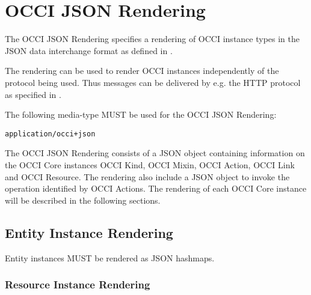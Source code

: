 \documentclass[10pt,a4paper]{article}
\begin{document}
\section{OCCI JSON Rendering}
\label{sec:json_format}
The OCCI JSON Rendering specifies a rendering of OCCI instance types in the JSON
data interchange format as defined in \cite{rfc4627}.

The rendering can be used to render OCCI instances independently of the
protocol being used. Thus messages can be delivered by e.g. the HTTP
protocol as specified in \cite{occi:http_rendering}.

The following media-type MUST be used for the OCCI JSON Rendering:

{\tt application/occi+json}

The OCCI JSON Rendering consists of a JSON object containing information on the 
OCCI Core instances OCCI Kind, OCCI Mixin, OCCI Action,
OCCI Link and OCCI Resource. The rendering also include a JSON object to invoke
the operation identified by OCCI Actions.
The rendering of each OCCI Core instance will be
described in the following sections. 

\subsection{Entity Instance Rendering}
\label{sec:format_entity_instance_rendering}

Entity instances MUST be rendered as JSON hashmaps.

\subsubsection{Resource Instance Rendering}
\label{sec:format_resource}
\end{document}
